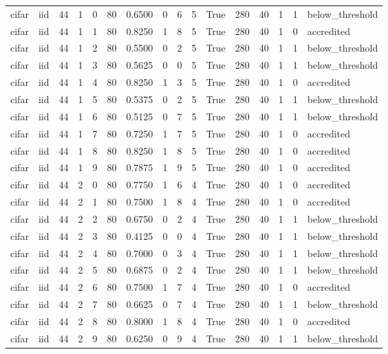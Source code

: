 \begin{tabular}{llrrrrrrrrrrrrrl}
cifar & iid & 44 & 1 & 0 & 80 & 0.6500 & 0 & 6 & 5 & True & 280 & 40 & 1 & 1 & below\_threshold \\
cifar & iid & 44 & 1 & 1 & 80 & 0.8250 & 1 & 8 & 5 & True & 280 & 40 & 1 & 0 & accredited \\
cifar & iid & 44 & 1 & 2 & 80 & 0.5500 & 0 & 2 & 5 & True & 280 & 40 & 1 & 1 & below\_threshold \\
cifar & iid & 44 & 1 & 3 & 80 & 0.5625 & 0 & 0 & 5 & True & 280 & 40 & 1 & 1 & below\_threshold \\
cifar & iid & 44 & 1 & 4 & 80 & 0.8250 & 1 & 3 & 5 & True & 280 & 40 & 1 & 0 & accredited \\
cifar & iid & 44 & 1 & 5 & 80 & 0.5375 & 0 & 2 & 5 & True & 280 & 40 & 1 & 1 & below\_threshold \\
cifar & iid & 44 & 1 & 6 & 80 & 0.5125 & 0 & 7 & 5 & True & 280 & 40 & 1 & 1 & below\_threshold \\
cifar & iid & 44 & 1 & 7 & 80 & 0.7250 & 1 & 7 & 5 & True & 280 & 40 & 1 & 0 & accredited \\
cifar & iid & 44 & 1 & 8 & 80 & 0.8250 & 1 & 8 & 5 & True & 280 & 40 & 1 & 0 & accredited \\
cifar & iid & 44 & 1 & 9 & 80 & 0.7875 & 1 & 9 & 5 & True & 280 & 40 & 1 & 0 & accredited \\
cifar & iid & 44 & 2 & 0 & 80 & 0.7750 & 1 & 6 & 4 & True & 280 & 40 & 1 & 0 & accredited \\
cifar & iid & 44 & 2 & 1 & 80 & 0.7500 & 1 & 8 & 4 & True & 280 & 40 & 1 & 0 & accredited \\
cifar & iid & 44 & 2 & 2 & 80 & 0.6750 & 0 & 2 & 4 & True & 280 & 40 & 1 & 1 & below\_threshold \\
cifar & iid & 44 & 2 & 3 & 80 & 0.4125 & 0 & 0 & 4 & True & 280 & 40 & 1 & 1 & below\_threshold \\
cifar & iid & 44 & 2 & 4 & 80 & 0.7000 & 0 & 3 & 4 & True & 280 & 40 & 1 & 1 & below\_threshold \\
cifar & iid & 44 & 2 & 5 & 80 & 0.6875 & 0 & 2 & 4 & True & 280 & 40 & 1 & 1 & below\_threshold \\
cifar & iid & 44 & 2 & 6 & 80 & 0.7500 & 1 & 7 & 4 & True & 280 & 40 & 1 & 0 & accredited \\
cifar & iid & 44 & 2 & 7 & 80 & 0.6625 & 0 & 7 & 4 & True & 280 & 40 & 1 & 1 & below\_threshold \\
cifar & iid & 44 & 2 & 8 & 80 & 0.8000 & 1 & 8 & 4 & True & 280 & 40 & 1 & 0 & accredited \\
cifar & iid & 44 & 2 & 9 & 80 & 0.6250 & 0 & 9 & 4 & True & 280 & 40 & 1 & 1 & below\_threshold \\

\end{tabular}
